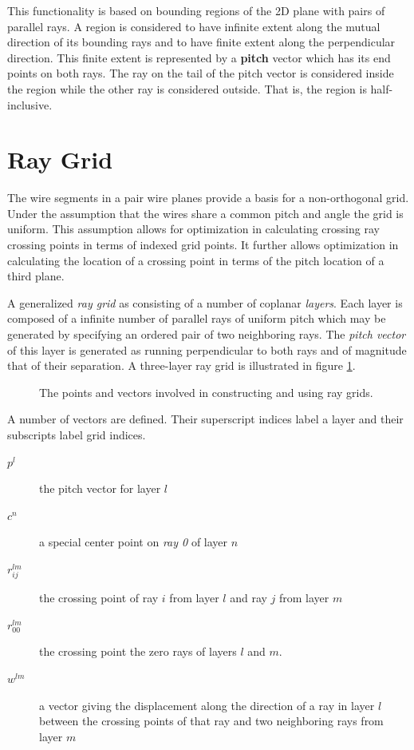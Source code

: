 \documentclass[11pt]{article}
\begin{document}
This functionality is based on bounding regions of the 2D plane with pairs of parallel rays.  A region is considered to have infinite extent along the mutual direction of its bounding rays and to have finite extent along the perpendicular direction.  This finite extent is represented by a \textbf{pitch} vector which has its end points on both rays.  The ray on the tail of the pitch vector is considered inside the region while the other ray is considered outside.   That is, the region is half-inclusive.  


\section{Ray Grid}
\label{sec:raygrid}

The wire segments in a pair wire planes provide a basis for a non-orthogonal grid.  Under the assumption that the wires share a common pitch and angle the grid is uniform.  This assumption allows for optimization in calculating crossing ray crossing points in terms of indexed grid points.  It further allows optimization in calculating the location of a crossing point in terms of the pitch location of a third plane.  

A generalized \emph{ray grid} as consisting of a number of coplanar \emph{layers}.  Each layer is composed of a infinite number of parallel rays of uniform pitch which may be generated by specifying an ordered pair of two neighboring rays.  The \emph{pitch vector} of this layer is generated as running perpendicular to both rays and of magnitude that of their separation.  A three-layer ray grid is illustrated in figure \ref{fig:raygrid}.

\begin{figure}[htbp]
\centering

\caption{\label{fig:raygrid}
The points and vectors involved in constructing and using ray grids.}
\end{figure}


A number of vectors are defined.  Their superscript indices label a layer and their subscripts label grid indices.

\begin{description}
\item[{\(p^l\)}] the pitch vector for layer \(l\)
\item[{\(c^n\)}] a special center point on \emph{ray 0} of layer \(n\)
\item[{\(r^{lm}_{ij}\)}] the crossing point of ray \(i\) from layer \(l\) and ray \(j\) from layer \(m\)
\item[{\(r^{lm}_{00}\)}] the crossing point the zero rays of layers \(l\) and \(m\).
\item[{\(w^{lm}\)}] a vector giving the displacement along the direction of a ray in layer \(l\) between the crossing points of that ray and two neighboring rays from layer \(m\)
\end{description}
\end{document}
